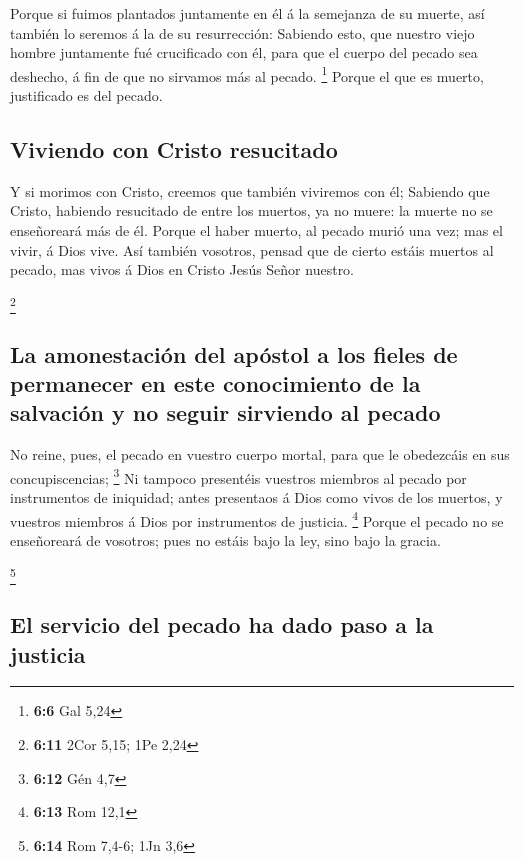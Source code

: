  Porque si fuimos plantados juntamente en él á la
semejanza de su muerte, así también lo seremos á la de su resurrección:
 Sabiendo esto, que nuestro viejo hombre juntamente fué
crucificado con él, para que el cuerpo del pecado sea deshecho, á fin de
que no sirvamos más al pecado. \footnote{\textbf{6:6} Gal 5,24}
 Porque el que es muerto, justificado es del pecado.

\hypertarget{viviendo-con-cristo-resucitado}{%
\subsection{Viviendo con Cristo
resucitado}\label{viviendo-con-cristo-resucitado}}

 Y si morimos con Cristo, creemos que también viviremos
con él;  Sabiendo que Cristo, habiendo resucitado de entre
los muertos, ya no muere: la muerte no se enseñoreará más de él.
 Porque el haber muerto, al pecado murió una vez; mas el
vivir, á Dios vive.  Así también vosotros, pensad que de
cierto estáis muertos al pecado, mas vivos á Dios en Cristo Jesús Señor
nuestro.

\footnote{\textbf{6:11} 2Cor 5,15; 1Pe 2,24}

\hypertarget{la-amonestaciuxf3n-del-apuxf3stol-a-los-fieles-de-permanecer-en-este-conocimiento-de-la-salvaciuxf3n-y-no-seguir-sirviendo-al-pecado}{%
\subsection{La amonestación del apóstol a los fieles de permanecer en
este conocimiento de la salvación y no seguir sirviendo al
pecado}\label{la-amonestaciuxf3n-del-apuxf3stol-a-los-fieles-de-permanecer-en-este-conocimiento-de-la-salvaciuxf3n-y-no-seguir-sirviendo-al-pecado}}

 No reine, pues, el pecado en vuestro cuerpo mortal, para
que le obedezcáis en sus concupiscencias; \footnote{\textbf{6:12} Gén
  4,7}  Ni tampoco presentéis vuestros miembros al pecado
por instrumentos de iniquidad; antes presentaos á Dios como vivos de los
muertos, y vuestros miembros á Dios por instrumentos de justicia.
\footnote{\textbf{6:13} Rom 12,1}  Porque el pecado no se
enseñoreará de vosotros; pues no estáis bajo la ley, sino bajo la
gracia.

\footnote{\textbf{6:14} Rom 7,4-6; 1Jn 3,6}

\hypertarget{el-servicio-del-pecado-ha-dado-paso-a-la-justicia}{%
\subsection{El servicio del pecado ha dado paso a la
justicia}\label{el-servicio-del-pecado-ha-dado-paso-a-la-justicia}}

